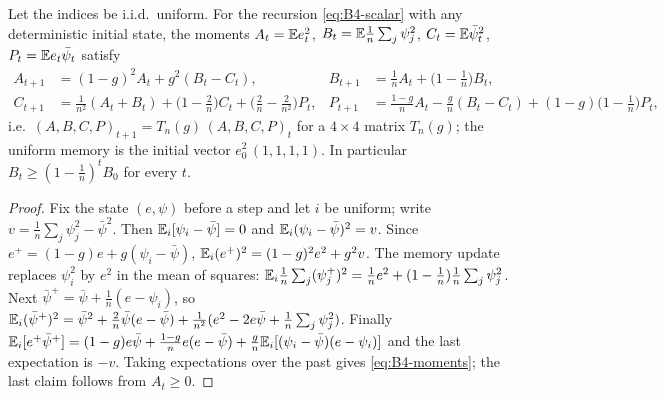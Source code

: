 \begin{proposition}\label{prop:B4-iid}
Let the indices be i.i.d.\ uniform. For the recursion \eqref{eq:B4-scalar} with any deterministic initial state, the moments $A_t=\mathbb{E} e_t^2$, $B_t=\mathbb{E}\frac1n\sum_j\psi_j^2$, $C_t=\mathbb{E}\bar\psi_t^2$, $P_t=\mathbb{E} e_t\bar\psi_t$ satisfy
\begin{equation}\label{eq:B4-moments}
\begin{aligned}
A_{t+1}&=(1-g)^2A_t+g^2(B_t-C_t), &
B_{t+1}&=\tfrac1nA_t+\big(1-\tfrac1n\big)B_t,\\
C_{t+1}&=\tfrac1{n^2}(A_t+B_t)+\big(1-\tfrac2n\big)C_t+\big(\tfrac2n-\tfrac2{n^2}\big)P_t, &
P_{t+1}&=\tfrac{1-g}nA_t-\tfrac gn(B_t-C_t)+(1-g)\big(1-\tfrac1n\big)P_t ,
\end{aligned}
\end{equation}
i.e.\ $(A,B,C,P)_{t+1}=T_n(g)\,(A,B,C,P)_t$ for a $4\times4$ matrix $T_n(g)$; the uniform memory is the initial vector $e_0^2\,(1,1,1,1)$. In particular $B_t\ge(1-\frac1n)^tB_0$ for every $t$.
\end{proposition}
\begin{proof}
Fix the state $(e,\psi)$ before a step and let $i$ be uniform; write $v=\frac1n\sum_j\psi_j^2-\bar\psi^2$. Then $\mathbb{E}_i[\psi_i-\bar\psi]=0$ and $\mathbb{E}_i(\psi_i-\bar\psi)^2=v$. Since $e^+=(1-g)e+g(\psi_i-\bar\psi)$, $\mathbb{E}_i(e^+)^2=(1-g)^2e^2+g^2v$. The memory update replaces $\psi_i^2$ by $e^2$ in the mean of squares: $\mathbb{E}_i\frac1n\sum_j(\psi_j^+)^2=\frac1ne^2+(1-\frac1n)\frac1n\sum_j\psi_j^2$. Next $\bar\psi^+=\bar\psi+\frac1n(e-\psi_i)$, so $\mathbb{E}_i(\bar\psi^+)^2=\bar\psi^2+\frac2n\bar\psi(e-\bar\psi)+\frac1{n^2}(e^2-2e\bar\psi+\frac1n\sum_j\psi_j^2)$. Finally $\mathbb{E}_i[e^+\bar\psi^+]=(1-g)e\bar\psi+\frac{1-g}ne(e-\bar\psi)+\frac gn\mathbb{E}_i[(\psi_i-\bar\psi)(e-\psi_i)]$ and the last expectation is $-v$. Taking expectations over the past gives \eqref{eq:B4-moments}; the last claim follows from $A_t\ge0$.
\end{proof}

